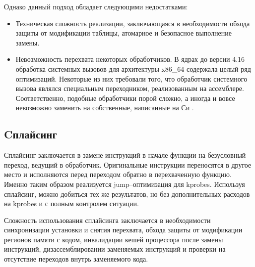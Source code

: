 Однако данный подход обладает следующими недостатками:
\begin{itemize}
	\item Техническая сложность реализации, заключающаяся в необходимости обхода защиты от модификации таблицы, атомарное и безопасное выполнение замены.
	\item Невозможность перехвата некоторых обработчиков. В ядрах до версии 4.16 обработка системных вызовов для архитектуры x86\_64 содержала целый ряд оптимизаций. Некоторые из них требовали того, что обработчик системного вызова являлся специальным переходником, реализованным на ассемблере. Соответственно, подобные обработчики порой сложно, а иногда и вовсе невозможно заменить на собственные, написанные на Си \cite{all}.
\end{itemize}

\subsection{Cплайсинг}

Сплайсинг заключается в замене инструкций в начале функции на безусловный переход, ведущий в обработчик. Оригинальные инструкции переносятся в другое место и исполняются перед переходом обратно в перехваченную функцию. Именно таким образом реализуется jump--оптимизация для kprobes. Используя сплайсинг, можно добиться тех же результатов, но без дополнительных расходов на kprobes и с полным контролем ситуации.

Сложность использования сплайсинга заключается в необходимости синхронизации установки и снятия перехвата, обхода защиты от модификации регионов памяти с кодом, инвалидации кешей процессора после замены инструкций, дизассемблировании заменяемых инструкций и проверки на отсутствие переходов внутрь заменяемого кода.




